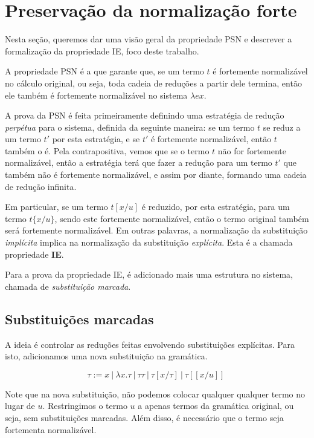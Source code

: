 


\section{Preservação da normalização forte}
\label{sec:psn}

Nesta seção, queremos dar uma visão geral da propriedade PSN e descrever a
formalização da propriedade IE, foco deste trabalho. 

A propriedade PSN é a que garante que, se um termo $t$ é fortemente
normalizável no cálculo original, ou seja, toda cadeia de reduções a partir dele
termina, então ele também é fortemente normalizável no sistema $\lambda ex$.

A prova da PSN é feita primeiramente definindo uma estratégia de redução
\emph{perpétua} para o sistema, definida da seguinte maneira: se um termo
$t$ se reduz a um termo $t'$ por esta estratégia, e se $t'$ é
fortemente normalizável, então $t$ também o é. Pela contrapositiva, vemos
que se o termo $t$ não for fortemente normalizável, então a estratégia terá
que fazer a redução para um termo $t'$ que também não é fortemente
normalizável, e assim por diante, formando uma cadeia de redução infinita.

Em particular, se um termo $t[x/u]$ é reduzido, por esta estratégia, para um
termo $t\{x/u\}$, sendo este fortemente normalizável, então o termo original
também será fortemente normalizável. Em outras palavras, a normalização da
substituição \emph{implícita} implica na normalização da substituição
\emph{explícita}. Esta é a chamada propriedade \textbf{IE}.

Para a prova da propriedade IE, é adicionado mais uma estrutura no sistema,
chamada de \emph{substituição marcada}.

\subsection{Substituições marcadas}
\label{sub:subst_marc}

A ideia é controlar as reduções feitas envolvendo substituições explícitas. Para
isto, adicionamos uma nova substituição na gramática.

\[ \tau := x\ |\ \lambda x.\tau\ |\ \tau \tau\ |\ \tau[x/\tau]\ |\
    \tau[[x/u]]\ \]

Note que na nova substituição, não podemos colocar qualquer qualquer termo no
lugar de $u$. Restringimos o termo $u$ a apenas termos da gramática
original, ou seja, sem substituições marcadas. Além disso, é necessário que o
termo seja fortementa normalizável.

